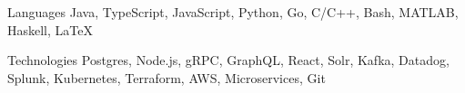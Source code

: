 
\begin{cvskills}
  \cvskill
    {Languages}
    {
      Java,
      TypeScript,
      JavaScript,
      Python,
      Go,
      C/C++,
      Bash,
      MATLAB,
      Haskell,
      LaTeX
    }

  \cvskill
    {Technologies}
    {
      Postgres,
      Node.js,
      gRPC,
      GraphQL,
      React,
      Solr,
      Kafka,
      Datadog,
      Splunk,
      Kubernetes,
      Terraform,
      AWS,
      Microservices,
      Git
    }
\end{cvskills}
